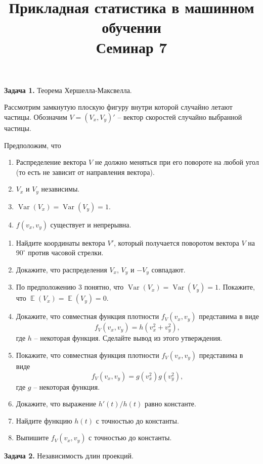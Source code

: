 \documentclass[10pt, a4paper]{extarticle}
\title{{\normalsize Прикладная статистика в машинном обучении} \\ \vspace{0.5em} Семинар 7}
\author{\rule{15cm}{0.4pt}}
\DeclareMathOperator{\Var}{Var}
\DeclareMathOperator{\E}{\mathbb{E}}
\begin{document}
	
	\maketitle

	{\Large \textbf{Задача 1.} Теорема Хершелла-Максвелла.} 
	
	Рассмотрим замкнутую плоскую фигуру внутри которой случайно летают частицы. Обозначим $V = (V_x, V_y)'$ -- вектор скоростей случайно выбранной частицы.
	
	Предположим, что
	\begin{enumerate}
		\item Распределение вектора $V$ не должно меняться при его повороте на любой угол (то есть не зависит от направления вектора).
		\item $V_x$ и $V_y$ независимы.
		\item $\Var(V_x) = \Var(V_y) = 1$.
		\item $f(v_x, v_y)$ существует и непрерывна.
	\end{enumerate}
	
	\begin{enumerate}[label=\textbf{\alph*)}]
		\item Найдите координаты вектора $V'$, который получается поворотом вектора $V$ на $90^{\circ}$ против часовой стрелки.
		\item Докажите, что распределения $V_x$, $V_y$ и $-V_y$ совпадают.
		\item По предположению 3 понятно, что $\Var(V_x) = \Var(V_y) = 1$. Покажите, что $\E(V_x) = \E(V_y) = 0$.
		\item Докажите, что совместная функция плотности $f_V(v_x, v_y)$ представима в виде
		\[
		f_V(v_x, v_y) = h(v_x^2 + v_y^2),
		\]
		где $h$ -- некоторая функция. Сделайте вывод из этого утверждения.
		\item Покажите, что совместная функция плотности $f_V(v_x, v_y)$ представима в виде
		\[
		f_V(v_x, v_y) = g(v_x^2)g(v_y^2),
		\]
		где $g$ -- некоторая функция.
		\item Докажите, что выражение $h'(t)/h(t)$ равно константе.
		\item Найдите функцию $h(t)$ с точностью до константы.
		\item Выпишите $f_V(v_x, v_y)$ с точностью до константы.
	\end{enumerate}
	\vspace{1em}
	
	{\Large \textbf{Задача 2.} Независимость длин проекций.}
	
\end{document}
